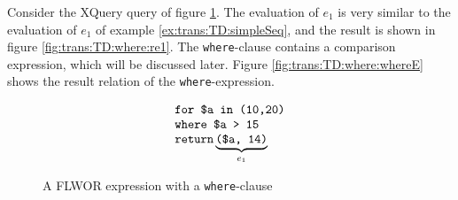 \begin{myExample}
Consider the XQuery query of figure \ref{fig:trans:TD:whereQuery}. The evaluation of $e_{1}$ is very similar to
the evaluation of $e_{1}$ of example \ref{ex:trans:TD:simpleSeq}, and the
result is shown in figure \ref{fig:trans:TD:where:re1}. The \texttt{where}-clause contains a comparison
expression, which will be discussed later. Figure \ref{fig:trans:TD:where:whereE} shows the result relation of the
\texttt{where}-expression.

\begin{figure}[h]
\centering
\begin{equation*}
\begin{array}{l}
\mbox{\texttt{for \$a in (10,20)}} \\
\mbox{\texttt{where \$a > 15}} \\
\mbox{\texttt{return}} \underbrace{\mbox{\texttt{(\$a, 14)}}}_{e_{1}}
\end{array}
\end{equation*}
\caption{A FLWOR expression with a \texttt{where}-clause \label{fig:trans:TD:whereQuery}}
\end{figure}

\begin{figure}[h]
\centering
{}
\qquad
{}
\qquad
{}


\end{figure}
\end{myExample}
